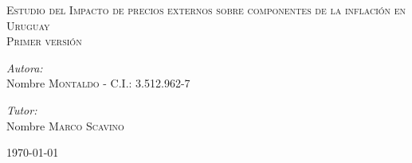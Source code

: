 \documentclass[a4paper,12pt]{article} %
\begin{document}
%
\renewcommand{\contentsname}{Tabla de contenidos}      %
\renewcommand{\tablename}{\bfseries Tabla}             %
\renewcommand{\figurename}{\bfseries Figura}           %
\newcommand{\subfigureautorefname}{\figureautorefname} %

\begin{titlepage}
	
	\begin{center}
	
	\textsc{\huge  Estudio del Impacto de precios externos sobre componentes de la inflación en Uruguay}\\[1.5cm] %
	
	\textsc{\LARGE Primer versión}\\[0.5cm] %
	
	
	\vspace{-0.5cm}
	
	\noindent
	\begin{flushleft} \large
		\emph{Autora:}\\
		Nombre \textsc{Montaldo} - C.I.: 3.512.962-7 \\

		
		\vspace{0.5cm}
		
		\emph{Tutor:} \\
		Nombre \textsc{Marco Scavino}
	\end{flushleft}
	\vfill
	
	{\large \today}
	
	\end{center}
\end{titlepage}
\end{document}
